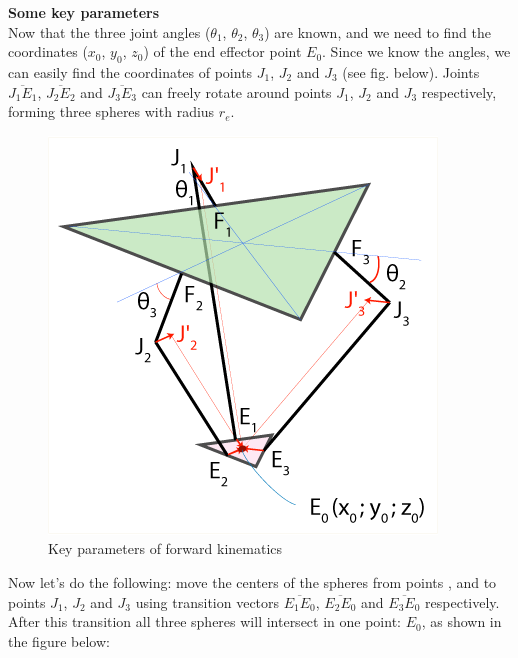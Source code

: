\textbf{Some key parameters} \\

Now that the three joint angles ($\theta_{1}$, $\theta_{2}$, $\theta_{3}$) are known, and we need to find the coordinates ($x_{0}$, $y_{0}$, $z_{0}$) of the end effector point $E_{0}$.
Since we know the angles, we can easily find the coordinates of points $J_{1}$, $J_{2}$ and $J_{3}$ (see fig. below).
Joints $\overline{J_{1}E_{1}}$, $\overline{J_{2}E_{2}}$ and $\overline{J_{3}E_{3}}$ can freely rotate around points $J_{1}$, $J_{2}$ and $J_{3}$ respectively, forming three spheres with radius $r_{e}$.
\begin{figure}[H]
	\centering
	\includegraphics[width=\maxwidth{10cm}, keepaspectratio]{Chapters/Fig/forward_kinematics_key_parameters.png}
	\caption{Key parameters of forward kinematics}
	\label{fig:forward_kinematics_key_parameters}
\end{figure}
Now let's do the following: move the centers of the spheres from points , and to points $J_{1}$, $J_{2}$ and $J_{3}$ using transition vectors $\overline{E_{1}E_{0}}$, $\overline{E_{2}E_{0}}$ and $\overline{E_{3}E_{0}}$ respectively. After this transition all three spheres will
intersect in one point: $E_{0}$, as shown in the figure below:
